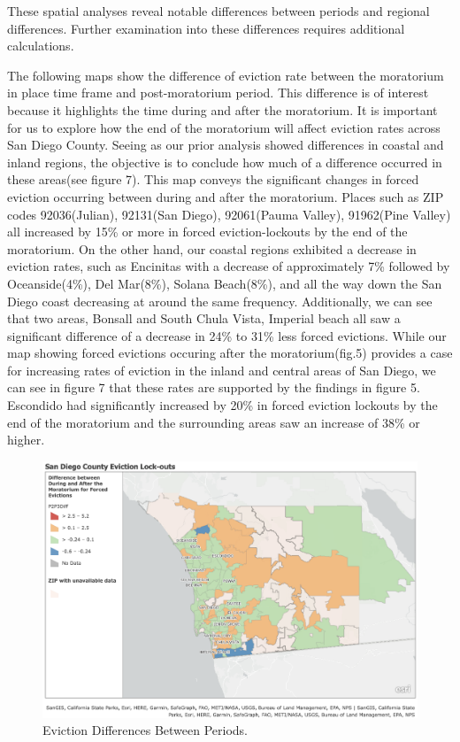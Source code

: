 \documentclass[man, 12pt, donotrepeattitle, floatsintext]{apa7} %
\begin{document}
These spatial analyses reveal notable differences between periods and regional differences. Further examination into these differences requires additional calculations. 

The following maps show the difference of eviction rate between the moratorium in place time frame and post-moratorium period. This difference is of interest because it highlights the time during and after the moratorium. It is important for us to explore how the end of the moratorium will affect eviction rates across San Diego County. Seeing as our prior analysis showed differences in coastal and inland regions, the objective is to conclude how much of a difference occurred in these areas(see figure 7). This map conveys the significant changes in forced eviction occurring between during and after the moratorium. Places such as ZIP codes 92036(Julian), 92131(San Diego), 92061(Pauma Valley), 91962(Pine Valley) all increased by 15\% or more in forced eviction-lockouts by the end of the moratorium. On the other hand, our coastal regions exhibited a decrease in eviction rates, such as Encinitas with a decrease of approximately 7\% followed by Oceanside(4\%), Del Mar(8\%), Solana Beach(8\%), and all the way down the San Diego coast decreasing at around the same frequency. Additionally, we can see that two areas, Bonsall and South Chula Vista, Imperial beach all saw a significant difference of a decrease in 24\% to 31\% less forced evictions. While our map showing forced evictions occuring after the moratorium(fig.5) provides a case for increasing rates of eviction in the inland and central areas of San Diego, we can see in figure 7 that these rates are supported by the findings in figure 5. Escondido had significantly increased by 20\% in forced eviction lockouts by the end of the moratorium and the surrounding areas saw an increase of 38\% or higher.


\begin{figure}[H]
  \includegraphics[width=\linewidth]{figures/gis_p2p3diff_figure4.png}
  \caption{Eviction Differences Between Periods.}
  \label{fig:Evictions_DuringtoPostMoratorium_5}
\end{figure}
\end{document}
